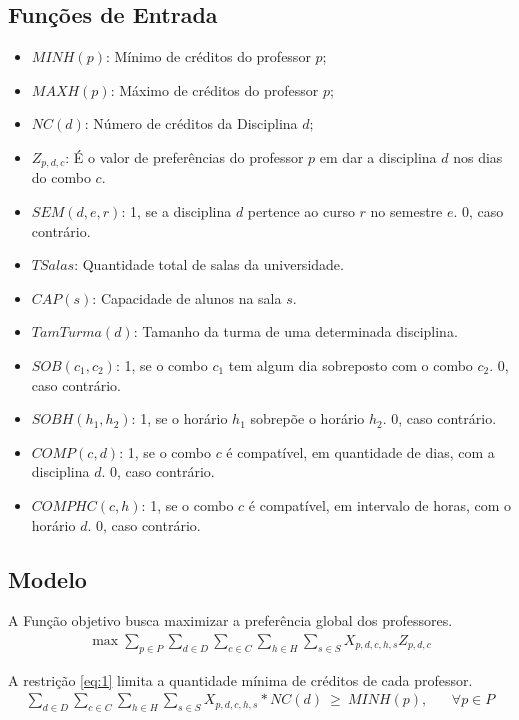 \subsection{Funções de Entrada} \label{entrada}
\begin{itemize}
\item $MINH(p)$: Mínimo de créditos do professor $p$;
\item $MAXH(p)$: Máximo de créditos do professor $p$;
\item $NC(d)$: Número de créditos da Disciplina $d$;
\item $Z_{p, d, c}$: É o valor de preferências do professor $p$ em dar a disciplina $d$ nos dias do combo $c$.
\item $SEM(d, e, r)$: 1, se a disciplina $d$ pertence ao curso $r$ no semestre $e$. 0, caso contrário.
\item $TSalas$: Quantidade total de salas da universidade.
\item $CAP(s)$: Capacidade de alunos na sala $s$.
\item $TamTurma(d)$: Tamanho da turma de uma determinada disciplina.
\item $SOB(c_1, c_2)$: 1, se o combo $c_1$ tem algum dia sobreposto com o combo $c_2$. 0, caso contrário.
\item $SOBH(h_1, h_2)$: 1, se o horário $h_1$ sobrepõe o horário $h_2$. 0, caso contrário.
\item $COMP(c, d)$: 1, se o combo $c$ é compatível, em quantidade de dias, com a disciplina $d$. 0, caso contrário.
\item $COMPHC(c, h)$: 1, se o combo $c$ é compatível, em intervalo de horas, com o horário $d$. 0, caso contrário.
\end{itemize}


\subsection{Modelo} \label{modelo}
A Função objetivo busca maximizar a preferência global dos professores.
\begin{align*}
	\max \sum_{p \in P} \sum_{d \in D} \sum_{c \in C} \sum_{h \in H} \sum_{s \in S} X_{p, d, c, h, s} Z_{p, d, c}
\end{align*}

\setcounter{equation}{0}
A restrição \ref{eq:1} limita a quantidade mínima de créditos de cada professor.
\begin{align}
	\sum_{d \in D} \sum_{c \in C} \sum_{h \in H} \sum_{s \in S} X_{p, d, c, h, s} * NC(d) \ \geq \ MINH(p), & \ \ \ \ \forall p \in P \label{eq:1}
\end{align}

